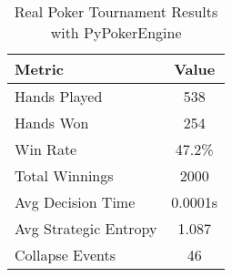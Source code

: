 \begin{table}[h]
\centering
\caption{Real Poker Tournament Results with PyPokerEngine}
\begin{tabular}{|l|c|}
\hline
Metric & Value \\
\hline
Hands Played & 538 \\
Hands Won & 254 \\
Win Rate & 47.2\% \\
Total Winnings & 2000 \\
Avg Decision Time & 0.0001s \\
Avg Strategic Entropy & 1.087 \\
Collapse Events & 46 \\
\hline
\end{tabular}
\end{table}